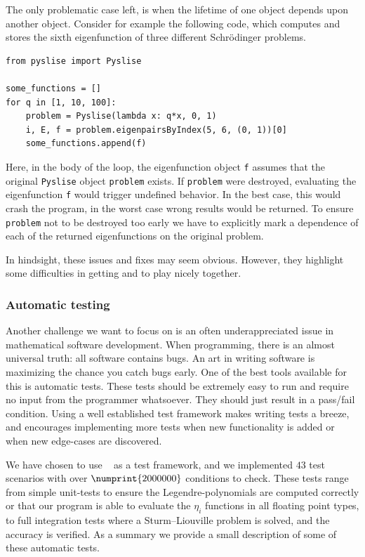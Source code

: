 The only problematic case left, is when the lifetime of one object depends upon another object. Consider for example the following \lpython{} code, which computes and stores the sixth eigenfunction of three different Schrödinger problems.
\begin{verbatim}
from pyslise import Pyslise

some_functions = []
for q in [1, 10, 100]:
    problem = Pyslise(lambda x: q*x, 0, 1)
    i, E, f = problem.eigenpairsByIndex(5, 6, (0, 1))[0]
    some_functions.append(f)
\end{verbatim}
Here, in the body of the loop, the eigenfunction object \texttt{f} assumes that the original \texttt{Pyslise} object \texttt{problem} exists. If \texttt{problem} were destroyed, evaluating the eigenfunction \texttt{f} would trigger undefined behavior. In the best case, this would crash the program, in the worst case wrong results would be returned. To ensure \texttt{problem} not to be destroyed too early we have to explicitly mark a dependence of each of the returned eigenfunctions on the original problem.

In hindsight, these issues and fixes may seem obvious. However, they highlight some difficulties in getting \lpython{} and \cpp{} to play nicely together.

\subsubsection{Automatic testing}\label{sec:c2_implementation_automatic_testing}

Another challenge we want to focus on is an often underappreciated issue in mathematical software development. When programming, there is an almost universal truth: all software contains bugs. An art in writing software is maximizing the chance you catch bugs early. One of the best tools available for this is automatic tests. These tests should be extremely easy to run and require no input from the programmer whatsoever. They should just result in a pass/fail condition. Using a well established test framework makes writing tests a breeze, and encourages implementing more tests when new functionality is added or when new edge-cases are discovered.

We have chosen to use \catch{}~\cite{horenovsky_catch2_2023} as a test framework, and we implemented $43$ test scenarios with over $\numprint{2000000}$ conditions to check. These tests range from simple unit-tests to ensure the Legendre-polynomials are computed correctly or that our program is able to evaluate the $\eta_i$ functions in all floating point types, to full integration tests where a Sturm--Liouville problem is solved, and the accuracy is verified. As a summary we provide a small description of some of these automatic tests.

